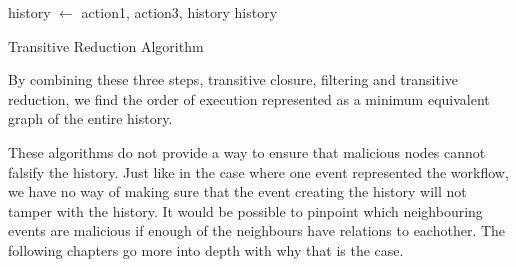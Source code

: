 	\begin{algorithm}
		\begin{algorithmic}
										\State history $\leftarrow$  {action1, action3, history}
									\EndIf
								\EndIf
							\EndFor
						\EndIf
					\EndFor
				\EndFor
			\State
			\Return history
			\EndFunction
		\end{algorithmic}
		\caption{Transitive Reduction Algorithm}
	\end{algorithm}
		
	\newpar By combining these three steps, transitive closure, filtering and transitive reduction, we find the order of execution represented as a minimum equivalent graph of the entire history. 
	
	\newpar These algorithms do not provide a way to ensure that malicious nodes cannot falsify the history. Just like in the case where one event represented the workflow, we have no way of making sure that the event creating the history will not tamper with the history. It would be possible to pinpoint which neighbouring events are malicious if enough of the neighbours have relations to eachother. The following chapters go more into depth with why that is the case.
	